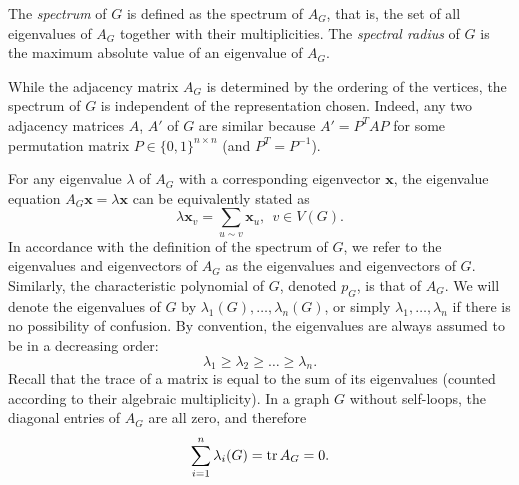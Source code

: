 \begin{definition}
    The \textit{spectrum} of $G$ is defined as the spectrum of $A_G$, that is, the set of all eigenvalues of $A_G$ together with their multiplicities.
    The \textit{spectral radius} of $G$ is the maximum absolute value of an eigenvalue of $A_G$.
\end{definition}

\begin{remark}
    While the adjacency matrix $A_G$ is determined by the ordering of the vertices, the spectrum of $G$ is independent of the representation chosen. 
    Indeed, any two adjacency matrices $A$, $A'$ of $G$ are similar because $A' = P^T AP$ for some permutation matrix $P \in \{0, 1\}^{n \times n}$ (and $P^T = P^{-1}$).
\end{remark}

For any eigenvalue $\lambda$ of $A_G$ with a corresponding eigenvector $\bm{x}$, the eigenvalue equation $A_G \bm{x} = \lambda \bm{x}$ can be equivalently stated as 
\begin{equation*}
    \lambda \bm{x}_v = \sum \limits_{u \sim v} \bm{x}_u, \ \ v \in V(G).
\end{equation*}
In accordance with the definition of the spectrum of $G$, we refer to the eigenvalues and eigenvectors of $A_G$ as the eigenvalues and eigenvectors of $G$.
Similarly, the characteristic polynomial of $G$, denoted $p_G$, is that of $A_G$. 
We will denote the eigenvalues of $G$ by $\lambda_1(G), \dots, \lambda_n(G)$, or simply $\lambda_1, \dots, \lambda_n$ if there is no possibility of confusion. 
By convention, the eigenvalues are always assumed to be in a decreasing order:
\begin{equation*}
    \lambda_1 \ge \lambda_2 \ge \dots \ge \lambda_n.
\end{equation*}
Recall that the trace of a matrix is equal to the sum of its eigenvalues (counted according to their algebraic multiplicity).
In a graph $G$ without self-loops, the diagonal entries of $A_G$ are all zero, and therefore 
\begin{equation*}
    \sum \limits_{i = 1}^n \lambda_i(G) = \operatorname{tr} A_G = 0.
\end{equation*}

